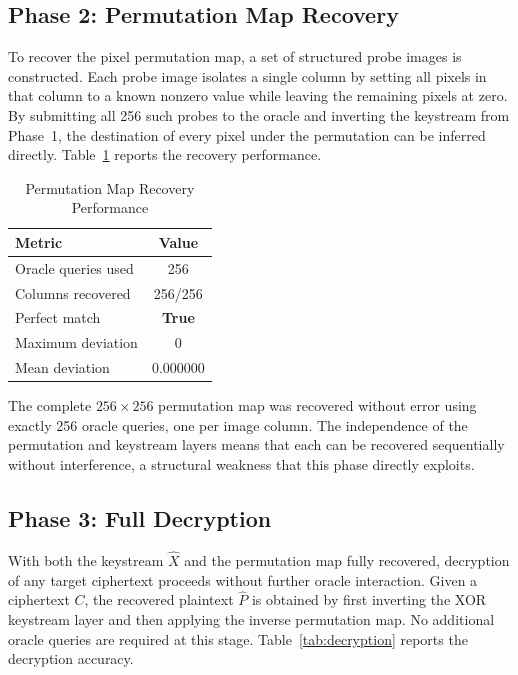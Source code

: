 \subsection{Phase 2: Permutation Map Recovery}

To recover the pixel permutation map, a set of structured probe images is constructed. Each probe image isolates a single column by setting all pixels in that column to a known nonzero value while leaving the remaining pixels at zero. By submitting all 256 such probes to the oracle and inverting the keystream from Phase~1, the destination of every pixel under the permutation can be inferred directly. Table~\ref{tab:permutation} reports the recovery performance.

\begin{table}[t]
\centering
\caption{Permutation Map Recovery Performance}
\label{tab:permutation}
\begin{tabular}{@{}lc@{}}
\toprule
\textbf{Metric} & \textbf{Value} \\
\midrule
Oracle queries used & 256 \\
Columns recovered   & 256/256 \\
Perfect match       & \textbf{True} \\
Maximum deviation   & 0 \\
Mean deviation      & 0.000000 \\
\bottomrule
\end{tabular}
\end{table}

The complete $256 \times 256$ permutation map was recovered without error using exactly 256 oracle queries, one per image column. The independence of the permutation and keystream layers means that each can be recovered sequentially without interference, a structural weakness that this phase directly exploits.

\subsection{Phase 3: Full Decryption}

With both the keystream $\hat{X}$ and the permutation map fully recovered, decryption of any target ciphertext proceeds without further oracle interaction. Given a ciphertext $C$, the recovered plaintext $\hat{P}$ is obtained by first inverting the XOR keystream layer and then applying the inverse permutation map. No additional oracle queries are required at this stage. Table~\ref{tab:decryption} reports the decryption accuracy.

